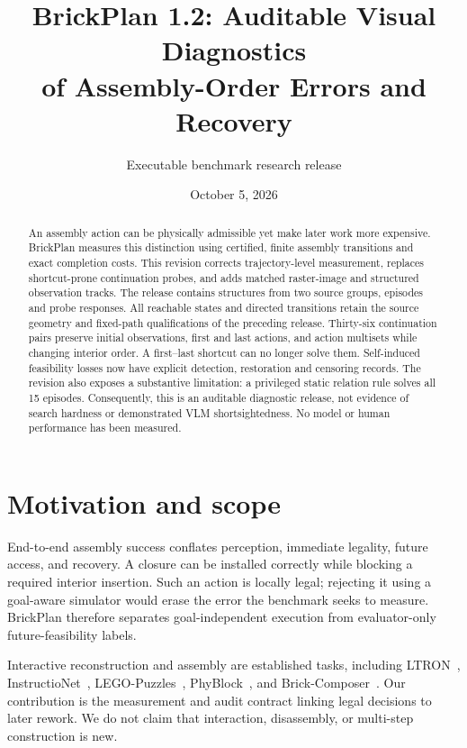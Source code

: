 \documentclass[10pt,twocolumn]{article}
\title{BrickPlan 1.2: Auditable Visual Diagnostics\\of Assembly-Order Errors and Recovery}
\author{Executable benchmark research release}
\date{October 5, 2026}
\begin{document}
\maketitle
\begin{abstract}
An assembly action can be physically admissible yet make later work more
expensive. BrickPlan measures this distinction using certified, finite
assembly transitions and exact completion costs. This revision corrects
trajectory-level measurement, replaces shortcut-prone continuation probes,
and adds matched raster-image and structured observation tracks.
The release contains \StructureCount{} structures from two source groups,
\EpisodeCount{} episodes and \ProbeCount{} probe responses.
All \StateCount{} reachable states and \EdgeCount{} directed transitions retain
the source geometry and fixed-path qualifications of the preceding release.
Thirty-six continuation pairs preserve initial observations, first and last
actions, and action multisets while changing interior order. A first--last
shortcut can no longer solve them. Self-induced feasibility losses now have
explicit detection, restoration and censoring records.
The revision also exposes a substantive limitation: a privileged static
relation rule solves all 15 episodes. Consequently, this is an auditable
diagnostic release, not evidence of search hardness or demonstrated VLM
shortsightedness. No model or human performance has been measured.
\end{abstract}

\section{Motivation and scope}
End-to-end assembly success conflates perception, immediate legality, future
access, and recovery. A closure can be installed correctly while blocking a
required interior insertion. Such an action is locally legal; rejecting it
using a goal-aware simulator would erase the error the benchmark seeks to
measure. BrickPlan therefore separates goal-independent execution from
evaluator-only future-feasibility labels.

Interactive reconstruction and assembly are established tasks, including
LTRON~\cite{ltron}, InstructioNet~\cite{instructionet},
LEGO-Puzzles~\cite{legopuzzles}, PhyBlock~\cite{phyblock}, and
Brick-Composer~\cite{composer}. Our contribution is the measurement and audit
contract linking legal decisions to later rework. We do not claim that
interaction, disassembly, or multi-step construction is new.
\end{document}

